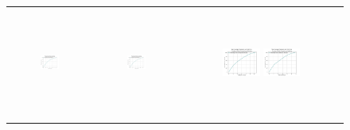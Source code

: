 \begin{figure}[p]
\begin{tabular}{ccc}
        \includegraphics[height=36mm,width=0.24\textwidth]{Images/simulation_no_obs/coverage_plots/21.png}
        & \includegraphics[height=36mm,width=0.24\textwidth]{Images/simulation_no_obs/coverage_plots/22.png}
        & \includegraphics[height=36mm,width=0.24\textwidth]{Images/simulation_no_obs/coverage_plots/23.png}
         \includegraphics[height=36mm,width=0.24\textwidth]{Images/simulation_no_obs/coverage_plots/24.png}\\[-4pt]


\end{tabular}
\end{figure}
